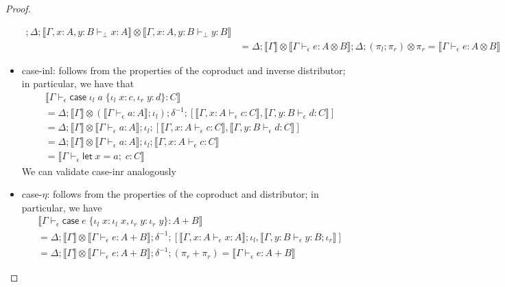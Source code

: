 \documentclass[acmsmall,screen,review]{acmart}
\newcommand{\ms}[1]{\ensuremath{\mathsf{#1}}}
\newcommand{\lto}{:}
\newcommand{\linl}[1]{\iota_l\;{#1}}
\newcommand{\linr}[1]{\iota_r\;{#1}}
\newcommand{\letexpr}[3]{\ensuremath{\ms{let}\;#1 = #2;\;#3}}
\newcommand{\caseexpr}[5]{\ms{case}\;#1\;\{\linl{#2} \lto #3, \linr{#4} \lto #5\}}
\newcommand{\bhyp}[2]{#1 : #2}
\newcommand{\hasty}[4]{#1 \vdash_{#2} #3: {#4}}
\newcommand{\brle}[1]{{\textsf{#1}}}
\newcommand{\dnt}[1]{\llbracket{#1}\rrbracket}
\begin{document}
\begin{proof}
\begin{itemize}[leftmargin=*]
\begin{align*}
                ; \Delta ; 
                \dnt{\hasty{\Gamma, \bhyp{x}{A}, \bhyp{y}{B}}{\bot}{x}{A}} \otimes
                \dnt{\hasty{\Gamma, \bhyp{x}{A}, \bhyp{y}{B}}{\bot}{y}{B}} \\
      &= \Delta ; \dnt{\Gamma} \otimes \dnt{\hasty{\Gamma}{\epsilon}{e}{A \otimes B}}
                ; \Delta ; (\pi_l ; \pi_r) \otimes \pi_r
       = \dnt{\hasty{\Gamma}{\epsilon}{e}{A \otimes B}}
    \end{align*}
    \item \brle{case-inl}: follows from the properties of the coproduct and inverse distributor; in
    particular, we have that
    \begin{align*}
      & \dnt{\hasty{\Gamma}{\epsilon}{\caseexpr{\linl{a}}{x}{c}{y}{d}}{C}}
      \\ &= \Delta 
      ; \dnt{\Gamma} \otimes (\dnt{\hasty{\Gamma}{\epsilon}{a}{A}} ; \iota_l)
      ; \delta^{-1} ; [
        \dnt{\hasty{\Gamma, \bhyp{x}{A}}{\epsilon}{c}{C}}, 
        \dnt{\hasty{\Gamma, \bhyp{y}{B}}{\epsilon}{d}{C}}
      ]
      \\ &= \Delta 
      ; \dnt{\Gamma} \otimes \dnt{\hasty{\Gamma}{\epsilon}{a}{A}}
      ; \iota_l ; [
        \dnt{\hasty{\Gamma, \bhyp{x}{A}}{\epsilon}{c}{C}}, 
        \dnt{\hasty{\Gamma, \bhyp{y}{B}}{\epsilon}{d}{C}}
      ]
      \\ &= \Delta 
      ; \dnt{\Gamma} \otimes \dnt{\hasty{\Gamma}{\epsilon}{a}{A}}
      ; \iota_l ; \dnt{\hasty{\Gamma, \bhyp{x}{A}}{\epsilon}{c}{C}}
      \\ &= \dnt{\hasty{\Gamma}{\epsilon}{\letexpr{x}{a}{c}}{C}}
    \end{align*}
    We can validate \brle{case-inr} analogously
    \item \brle{case-$\eta$}: follows from the properties of the coproduct and distributor; in
    particular, we have
    \begin{align*}
      & \dnt{\hasty{\Gamma}{\epsilon}{\caseexpr{e}{x}{\linl{x}}{y}{\linr{y}}}{A + B}} \\
      &= \Delta ; \dnt{\Gamma} \otimes \dnt{\hasty{\Gamma}{\epsilon}{e}{A + B}} ; \delta^{-1} ; [
        \dnt{\hasty{\Gamma, \bhyp{x}{A}}{\epsilon}{x}{A}};\iota_l,
        \dnt{\hasty{\Gamma, \bhyp{y}{B}}{\epsilon}{y}{B};\iota_r}
      ] \\
      &= \Delta ; \dnt{\Gamma} \otimes \dnt{\hasty{\Gamma}{\epsilon}{e}{A + B}} 
                ; \delta^{-1} ; (\pi_r + \pi_r)
      = \dnt{\hasty{\Gamma}{\epsilon}{e}{A + B}} 
    \end{align*}

\end{itemize}
\end{proof}
\end{document}

